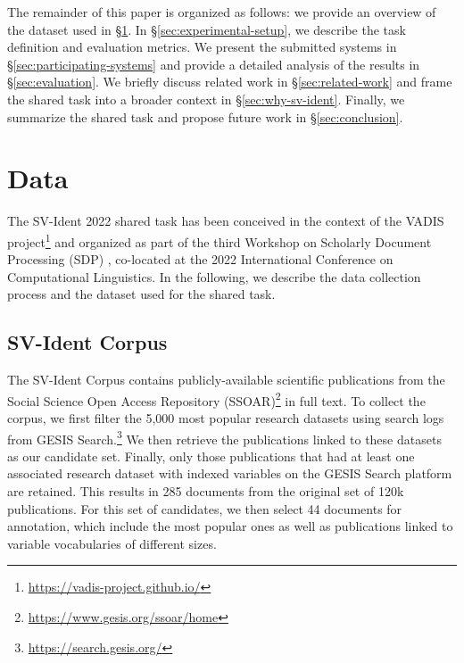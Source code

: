 \documentclass[11pt]{article}
\begin{document}
The remainder of this paper is organized as follows: we provide an overview of the dataset used in \S\ref{sec:data}.
In \S\ref{sec:experimental-setup}, we describe the task definition and evaluation metrics.
We present the submitted systems in \S\ref{sec:participating-systems} and provide a detailed analysis of the results in \S\ref{sec:evaluation}.
We briefly discuss related work in \S\ref{sec:related-work} and frame the shared task into a broader context in \S\ref{sec:why-sv-ident}.
Finally, we summarize the shared task and propose future work in \S\ref{sec:conclusion}.


\section{Data}
\label{sec:data}
The SV-Ident 2022 shared task has been conceived in the context of the VADIS project\footnote{\url{https://vadis-project.github.io/}} and organized as part of the third Workshop on Scholarly Document Processing (SDP) \cite{chandrasekaran-etal-2020-overview}, co-located at the 2022 International Conference on Computational Linguistics.
In the following, we describe the data collection process and the dataset used for the shared task.

\subsection{SV-Ident Corpus}
The SV-Ident Corpus contains publicly-available scientific publications from the Social Science Open Access Repository (SSOAR)\footnote{\url{https://www.gesis.org/ssoar/home}} in full text.
To collect the corpus, we first filter the 5,000 most popular research datasets using search logs from GESIS Search.\footnote{\url{https://search.gesis.org/}}
We then retrieve the publications linked to these datasets as our candidate set.
Finally, only those publications that had at least one associated research dataset with indexed variables on the GESIS Search platform are retained.
This results in 285 documents from the original set of 120k publications.
For this set of candidates, we then select 44 documents for annotation, which include the most popular ones as well as publications linked to variable vocabularies of different sizes.
\end{document}
